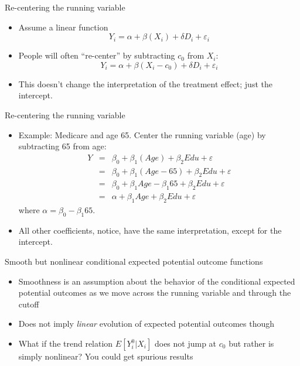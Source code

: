 \documentclass{beamer}
\begin{document}
\begin{frame}{Re-centering the running variable}
	
	\begin{itemize}
	\item Assume a linear function $$Y_i = \alpha + \beta(X_i) + \delta D_i + \varepsilon_i$$
	\item People will often ``re-center'' by subtracting $c_0$ from $X_i$:$$Y_i=\alpha + \beta(X_i-c_0) + \delta D_i +\varepsilon_i$$
	\item This doesn't change the interpretation of the treatment effect; just the intercept.
	\end{itemize}

\end{frame}



\begin{frame}{Re-centering the running variable}

\begin{itemize}
	\item Example: Medicare and age 65.  Center the running variable (age) by subtracting 65 from age:
		\begin{eqnarray*}
		Y &=& \beta_0 + \beta_1(Age) + \beta_2 Edu + \varepsilon \\
		&=& \beta_0 + \beta_1(Age-65) + \beta_2 Edu + \varepsilon\\
		&=& \beta_0 + \beta_1 Age - \beta_1 65 + \beta_2 Edu+ \varepsilon \\
		&=& \alpha + \beta_1 Age + \beta_2 Edu+ \varepsilon
		\end{eqnarray*}where $\alpha=\beta_0 - \beta_1 65$.  
		\item All other coefficients, notice, have the same interpretation, except for the intercept.
\end{itemize}

\end{frame}


\begin{frame}{Smooth but nonlinear conditional expected potential outcome functions}
	
	\begin{itemize}
	\item Smoothness is an assumption about the behavior of the conditional expected potential outcomes as we move across the running variable and through the cutoff
	\item Does not imply \emph{linear} evolution of expected potential outcomes though
	\item What if the trend relation $E[Y_i^0 | X_i]$ does not jump at $c_0$ but rather is simply nonlinear?  You could get spurious results
	\end{itemize}

\end{frame}
\end{document}
